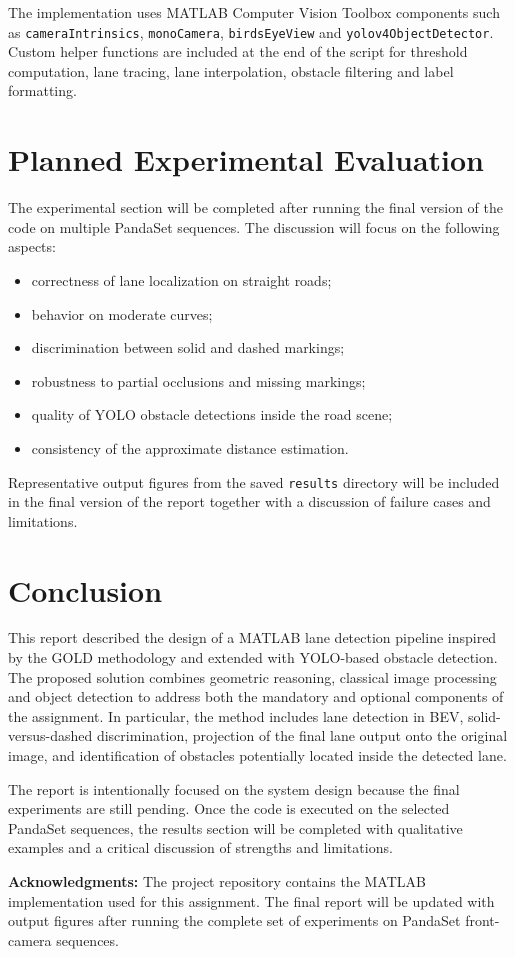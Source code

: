 \documentclass[conference]{IEEEtran}
\newcommand{\acknowledgments}[1]{\textbf{Acknowledgments:} #1}
\begin{document}
The implementation uses MATLAB Computer Vision Toolbox components such as \texttt{cameraIntrinsics}, \texttt{monoCamera}, \texttt{birdsEyeView} and \texttt{yolov4ObjectDetector}. Custom helper functions are included at the end of the script for threshold computation, lane tracing, lane interpolation, obstacle filtering and label formatting.

\section{Planned Experimental Evaluation}
\label{sec:results_placeholder}
The experimental section will be completed after running the final version of the code on multiple PandaSet sequences. The discussion will focus on the following aspects:
\begin{itemize}
    \item correctness of lane localization on straight roads;
    \item behavior on moderate curves;
    \item discrimination between solid and dashed markings;
    \item robustness to partial occlusions and missing markings;
    \item quality of YOLO obstacle detections inside the road scene;
    \item consistency of the approximate distance estimation.
\end{itemize}

Representative output figures from the saved \texttt{results} directory will be included in the final version of the report together with a discussion of failure cases and limitations.

\section{Conclusion}
This report described the design of a MATLAB lane detection pipeline inspired by the GOLD methodology and extended with YOLO-based obstacle detection. The proposed solution combines geometric reasoning, classical image processing and object detection to address both the mandatory and optional components of the assignment. In particular, the method includes lane detection in BEV, solid-versus-dashed discrimination, projection of the final lane output onto the original image, and identification of obstacles potentially located inside the detected lane.

The report is intentionally focused on the system design because the final experiments are still pending. Once the code is executed on the selected PandaSet sequences, the results section will be completed with qualitative examples and a critical discussion of strengths and limitations.




\vspace{8pt}
\acknowledgments{The project repository contains the MATLAB implementation used for this assignment. The final report will be updated with output figures after running the complete set of experiments on PandaSet front-camera sequences.}
\end{document}

